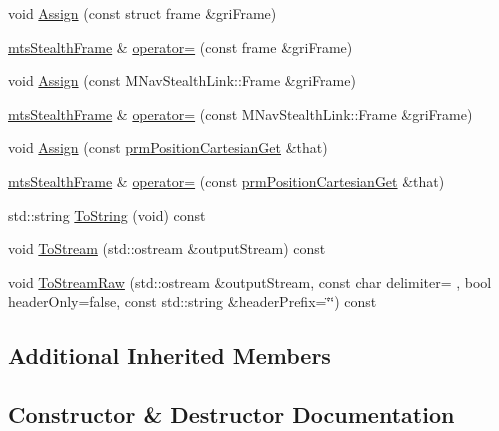 \begin{DoxyCompactItemize}
\item 
void \hyperlink{classmts_stealth_frame_af72faf583bebe3370e6bbc1436f57573}{Assign} (const struct frame \&gri\+Frame)
\item 
\hyperlink{classmts_stealth_frame}{mts\+Stealth\+Frame} \& \hyperlink{classmts_stealth_frame_a2c6000a1fa5bb27fae3a4f8c51a5312d}{operator=} (const frame \&gri\+Frame)
\item 
void \hyperlink{classmts_stealth_frame_af1699a73f8dfc4704d67edc43b994e7c}{Assign} (const M\+Nav\+Stealth\+Link\+::\+Frame \&gri\+Frame)
\item 
\hyperlink{classmts_stealth_frame}{mts\+Stealth\+Frame} \& \hyperlink{classmts_stealth_frame_aa96c149a0a583ec83a64142410f4c8c6}{operator=} (const M\+Nav\+Stealth\+Link\+::\+Frame \&gri\+Frame)
\item 
void \hyperlink{classmts_stealth_frame_ae570300bb135a8e9ab81d81e5456c552}{Assign} (const \hyperlink{classprm_position_cartesian_get}{prm\+Position\+Cartesian\+Get} \&that)
\item 
\hyperlink{classmts_stealth_frame}{mts\+Stealth\+Frame} \& \hyperlink{classmts_stealth_frame_a8350558bec876d3c65c609aecf3e2512}{operator=} (const \hyperlink{classprm_position_cartesian_get}{prm\+Position\+Cartesian\+Get} \&that)
\item 
std\+::string \hyperlink{classmts_stealth_frame_a04cfb56c66017fc8029c81ac91655e26}{To\+String} (void) const 
\item 
void \hyperlink{classmts_stealth_frame_ac6f6690c08ffaaad27f589a7dae4da28}{To\+Stream} (std\+::ostream \&output\+Stream) const 
\item 
void \hyperlink{classmts_stealth_frame_a0b6205e28c29ccc0ba25c553bea02419}{To\+Stream\+Raw} (std\+::ostream \&output\+Stream, const char delimiter= \textquotesingle{} \textquotesingle{}, bool header\+Only=false, const std\+::string \&header\+Prefix=\char`\"{}\char`\"{}) const 
\end{DoxyCompactItemize}
\subsection*{Additional Inherited Members}


\subsection{Constructor \& Destructor Documentation}
\hypertarget{classmts_stealth_frame_af32afe61af4982beef829344c6b96aea}{}
